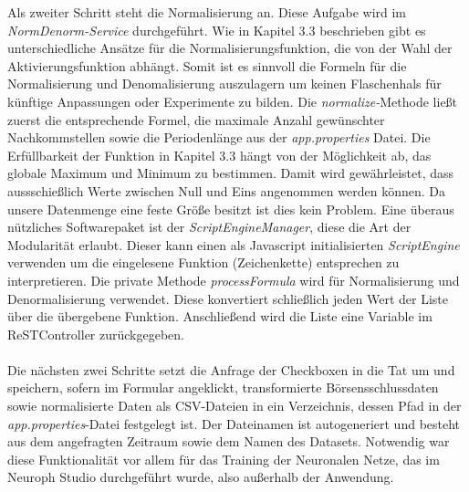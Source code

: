 Als zweiter Schritt steht die Normalisierung an. Diese Aufgabe wird im \emph{NormDenorm-Service} durchgeführt. Wie in Kapitel 3.3 beschrieben gibt es unterschiedliche Ansätze für die Normalisierungsfunktion, die von der Wahl der Aktivierungsfunktion abhängt. Somit ist es sinnvoll die Formeln für die Normalisierung und Denomalisierung auszulagern um keinen Flaschenhals für künftige Anpassungen oder Experimente zu bilden. Die \emph{normalize-}Methode ließt zuerst die entsprechende Formel, die maximale Anzahl gewünschter Nachkommstellen sowie die Periodenlänge aus der \emph{app.properties} Datei. Die Erfüllbarkeit der Funktion in Kapitel 3.3 hängt von der Möglichkeit ab, das globale Maximum und Minimum zu bestimmen. Damit wird gewährleistet, dass aussschießlich Werte zwischen Null und Eins angenommen werden können. Da unsere Datenmenge eine feste Größe besitzt ist dies kein Problem. 
Eine überaus nützliches Softwarepaket ist der \emph{ScriptEngineManager}, diese die Art der Modularität erlaubt. Dieser kann einen als Javascript initialisierten \emph{ScriptEngine} verwenden um die eingelesene Funktion (Zeichenkette) entsprechen zu interpretieren. Die private Methode \emph{processFormula} wird für Normalisierung und Denormalisierung verwendet. Diese konvertiert schließlich jeden Wert der Liste über die übergebene Funktion. 
Anschließend wird die Liste eine Variable im ReSTController zurückgegeben. \\\\

Die nächsten zwei Schritte setzt die Anfrage der Checkboxen in die Tat um und speichern, sofern im Formular angeklickt, transformierte Börsensschlussdaten sowie normalisierte Daten als CSV-Dateien in ein Verzeichnis, dessen Pfad in der \emph{app.properties}-Datei festgelegt ist. Der Dateinamen ist autogeneriert und besteht aus dem angefragten Zeitraum sowie dem Namen des Datasets. Notwendig war diese Funktionalität vor allem für das Training der Neuronalen Netze, das im Neuroph Studio durchgeführt wurde, also außerhalb der Anwendung. \\\\

